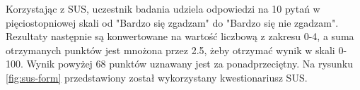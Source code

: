 \par
Korzystając z SUS, uczestnik badania udziela odpowiedzi na 10 pytań w pięciostopniowej skali od "Bardzo się zgadzam" do "Bardzo się nie zgadzam".
Rezultaty następnie są konwertowane na wartość liczbową z zakresu 0-4, a suma otrzymanych punktów jest mnożona przez 2.5, żeby otrzymać wynik w skali 0-100.
Wynik powyżej 68 punktów uznawany jest za ponadprzeciętny.
Na rysunku \ref{fig:sus-form} przedstawiony został wykorzystany kwestionariusz SUS.



\thispagestyle{normal}
